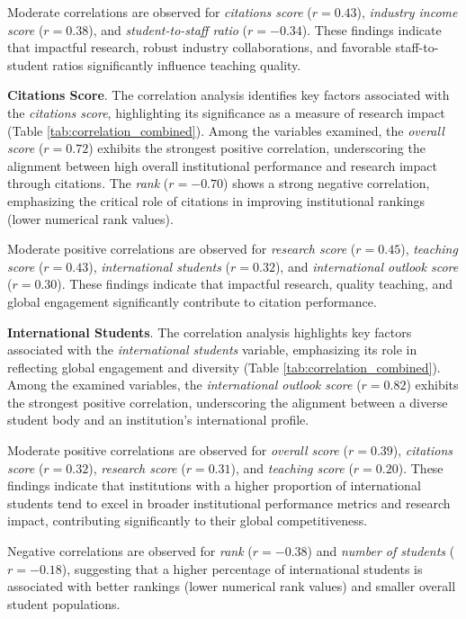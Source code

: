 \documentclass[conference]{IEEEtran}
\begin{document}
Moderate correlations are observed for \textit{citations score} ($r = 0.43$), \textit{industry income score} ($r = 0.38$), and \textit{student-to-staff ratio} ($r = -0.34$). These findings indicate that impactful research, robust industry collaborations, and favorable staff-to-student ratios significantly influence teaching quality.



\textbf{Citations Score}. The correlation analysis identifies key factors associated with the \textit{citations score}, highlighting its significance as a measure of research impact (Table \ref{tab:correlation_combined}). Among the variables examined, the \textit{overall score} ($r = 0.72$) exhibits the strongest positive correlation, underscoring the alignment between high overall institutional performance and research impact through citations. The \textit{rank} ($r = -0.70$) shows a strong negative correlation, emphasizing the critical role of citations in improving institutional rankings (lower numerical rank values).

Moderate positive correlations are observed for \textit{research score} ($r = 0.45$), \textit{teaching score} ($r = 0.43$), \textit{international students} ($r = 0.32$), and \textit{international outlook score} ($r = 0.30$). These findings indicate that impactful research, quality teaching, and global engagement significantly contribute to citation performance.


\textbf{International Students}. The correlation analysis highlights key factors associated with the \textit{international students} variable, emphasizing its role in reflecting global engagement and diversity (Table \ref{tab:correlation_combined}). Among the examined variables, the \textit{international outlook score} ($r = 0.82$) exhibits the strongest positive correlation, underscoring the alignment between a diverse student body and an institution's international profile.

Moderate positive correlations are observed for \textit{overall score} ($r = 0.39$), \textit{citations score} ($r = 0.32$), \textit{research score} ($r = 0.31$), and \textit{teaching score} ($r = 0.20$). These findings indicate that institutions with a higher proportion of international students tend to excel in broader institutional performance metrics and research impact, contributing significantly to their global competitiveness.

Negative correlations are observed for \textit{rank} ($r = -0.38$) and \textit{number of students} ($r = -0.18$), suggesting that a higher percentage of international students is associated with better rankings (lower numerical rank values) and smaller overall student populations. 
\end{document}

